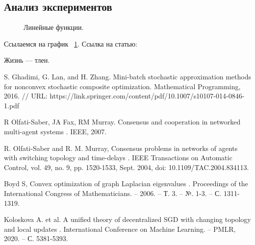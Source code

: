 \documentclass[a4paper,article,14pt]{extarticle}
\begin{document}
\subsection{Анализ экспериментов}
\begin{figure}[ht]
\begin{center}

\caption{
\label{graph-fig}
     Линейные функции.}
\end {center}
\end {figure}
Ссылаемся на график ~\ref{graph-fig}.
Ссылка на статью: \cite{mbgd}

Жизнь --- тлен.
\pagebreak


\begin{thebibliography}{1}
 S. Ghadimi, G. Lan, and H. Zhang. \flqq Mini-batch stochastic approximation methods for nonconvex stochastic composite optimization\frqq. Mathematical Programming, 2016. // URL: https://link.springer.com/content/pdf/10.1007/s10107-014-0846-1.pdf

 R Olfati-Saber, JA Fax, RM Murray. \flqq Consensus and cooperation in networked multi-agent systems \frqq. IEEE, 2007.

 R. Olfati-Saber and R. M. Murray, \flqq Consensus problems in networks of agents with switching topology and time-delays \frqq. IEEE Transactions on Automatic Control, vol. 49, no. 9, pp. 1520-1533, Sept. 2004, doi: 10.1109/TAC.2004.834113.

 Boyd S, \flqq Convex optimization of graph Laplacian eigenvalues \frqq. Proceedings of the International Congress of Mathematicians. – 2006. – Т. 3. – №. 1-3. – С. 1311-1319.

 Koloskova A. et al. \flqq A unified theory of decentralized SGD with changing topology and local updates \frqq. International Conference on Machine Learning. – PMLR, 2020. – С. 5381-5393.

\end{thebibliography}
\end{document}
